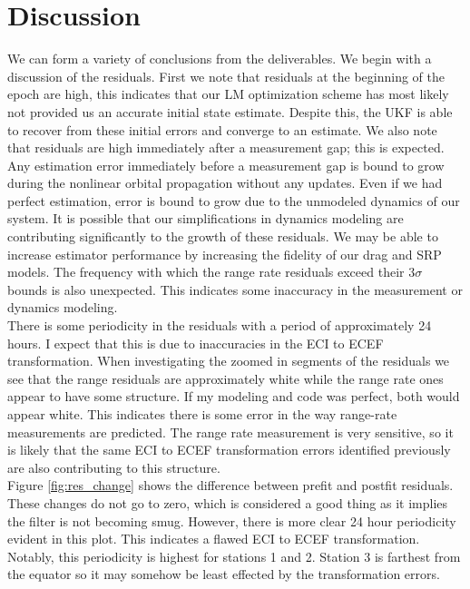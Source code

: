 \documentclass[11pt]{article}
\begin{document}
\section{Discussion}

We can form a variety of conclusions from the deliverables. We begin with a discussion of the residuals. First we note that residuals at the beginning of the epoch are high, this indicates that our LM optimization scheme has most likely not provided us an accurate initial state estimate. Despite this, the UKF is able to recover from these initial errors and converge to an estimate. We also note that residuals are high immediately after a measurement gap; this is expected. Any estimation error immediately before a measurement gap is bound to grow during the nonlinear orbital propagation without any updates. Even if we had perfect estimation, error is bound to grow due to the unmodeled dynamics of our system. It is possible that our simplifications in dynamics modeling are contributing significantly to the growth of these residuals. We may be able to increase estimator performance by increasing the fidelity of our drag and SRP models. The frequency with which the range rate residuals exceed their $3\sigma$ bounds is also unexpected. This indicates some inaccuracy in the measurement or dynamics modeling. \\

There is some periodicity in the residuals with a period of approximately 24 hours. I expect that this is due to inaccuracies in the ECI to ECEF transformation. When investigating the zoomed in segments of the residuals we see that the range residuals are approximately white while the range rate ones appear to have some structure. If my modeling and code was perfect, both would appear white. This indicates there is some error in the way range-rate measurements are predicted. The range rate measurement is very sensitive, so it is likely that the same ECI to ECEF transformation errors identified previously are also contributing to this structure. \\

Figure \ref{fig:res_change} shows the difference between prefit and postfit residuals. These changes do not go to zero, which is considered a good thing as it implies the filter is not becoming smug. However, there is more clear 24 hour periodicity evident in this plot. This indicates a flawed ECI to ECEF transformation. Notably, this periodicity is highest for stations 1 and 2. Station 3 is farthest from the equator so it may somehow be least effected by the transformation errors. \\ 
\end{document}
